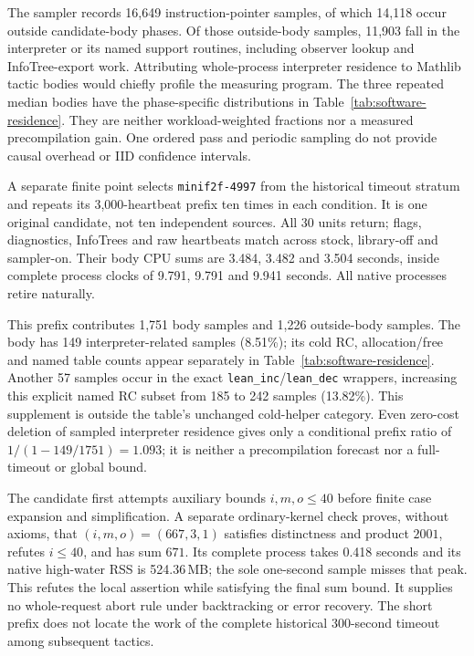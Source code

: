 \documentclass[10pt,twocolumn]{article}
\begin{document}
The sampler records 16,649 instruction-pointer samples, of which 14,118 occur outside
candidate-body phases. Of those outside-body samples, 11,903 fall in the
interpreter or its named support routines, including observer lookup and
InfoTree-export work. Attributing whole-process interpreter residence to
Mathlib tactic bodies would chiefly profile the measuring program.
The three repeated median bodies have the phase-specific distributions
in Table~\ref{tab:software-residence}. They are neither workload-weighted
fractions nor a measured precompilation gain. One ordered pass and periodic
sampling do not provide causal overhead or IID confidence intervals.

A separate finite point selects \texttt{minif2f-4997} from the historical
timeout stratum and repeats its 3,000-heartbeat prefix ten times in each
condition. It is one original candidate, not ten independent sources.
All 30 units return; flags, diagnostics, InfoTrees and raw heartbeats match
across stock, library-off and sampler-on. Their body CPU sums are 3.484,
3.482 and 3.504 seconds, inside complete process clocks of 9.791, 9.791 and
9.941 seconds. All native processes retire naturally.

This prefix contributes 1,751 body samples and 1,226 outside-body samples.
The body has 149 interpreter-related samples (8.51\%); its cold RC,
allocation/free and named table counts appear separately in
Table~\ref{tab:software-residence}. Another 57 samples occur in the exact
\texttt{lean\_inc}/\texttt{lean\_dec} wrappers, increasing this explicit named
RC subset from 185 to 242 samples (13.82\%). This supplement is outside the
table's unchanged cold-helper category. Even zero-cost deletion of sampled
interpreter residence gives only a conditional prefix ratio of
$1/(1-149/1751)=1.093$; it is neither a precompilation forecast nor a
full-timeout or global bound.

The candidate first attempts auxiliary bounds $i,m,o\leq40$ before finite
case expansion and simplification. A separate ordinary-kernel check proves,
without axioms, that $(i,m,o)=(667,3,1)$ satisfies distinctness and product
$2001$, refutes $i\leq40$, and has sum $671$. Its complete process takes
0.418 seconds and its native high-water RSS is 524.36\,MB; the sole one-second
sample misses that peak. This refutes the local assertion while satisfying
the final sum bound. It supplies no whole-request abort rule under
backtracking or error recovery. The short prefix does not locate the work
of the complete historical 300-second timeout among subsequent tactics.
\end{document}

